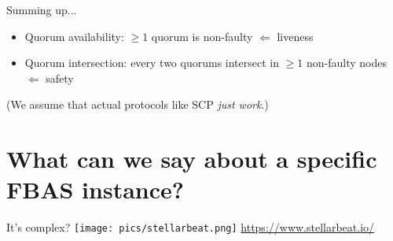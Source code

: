 \documentclass{beamer}
\DeclareMathOperator{\Q}{\mathbf{Q}}
\begin{document}
\begin{frame}{Summing up...}

      \begin{itemize}
        \item Quorum availability: $\ge1$ quorum is non-faulty $\Leftarrow$ \alert{liveness}
        \item Quorum intersection: every two quorums intersect in $\ge1$ non-faulty nodes $\Leftarrow$ \alert{safety}
      \end{itemize}
      \vfill
      (We assume that actual protocols like SCP \emph{just work}.)
\end{frame}

\section{What can we say about a specific FBAS instance?}

\begin{frame}{It's complex?}
  \vfill
  \texttt{[image: pics/stellarbeat.png]}
  \vfill
  \tiny\hfill
  \url{https://www.stellarbeat.io/}
\end{frame}

\end{document}
